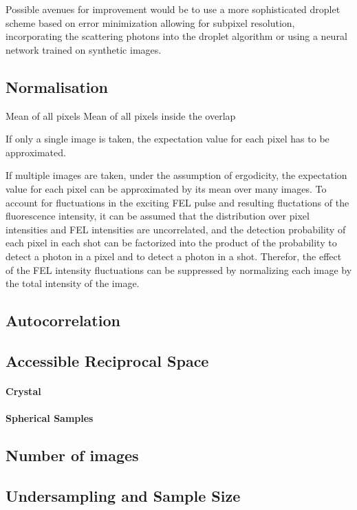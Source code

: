 Possible avenues for improvement would be to use a more sophisticated droplet scheme based on error minimization allowing for subpixel resolution, incorporating the scattering photons into the droplet algorithm or using a neural network trained on synthetic images.




\subsection{Normalisation}
Mean of all pixels 
Mean of all pixels inside the overlap

If only a single image is taken, the expectation value for each pixel has to be approximated.

If multiple images are taken, under the assumption of ergodicity, the expectation value for each pixel can be approximated by its mean over many images. To account for fluctuations in the exciting FEL pulse and resulting fluctations of the fluorescence intensity, it can be assumed that the distribution over pixel intensities and FEL intensities are uncorrelated, and the detection probability of each pixel in each shot can be factorized into the product of the probability to detect a photon in a pixel and to detect a photon in a shot. Therefor, the effect of the FEL intensity fluctuations can be suppressed by normalizing each image by the total intensity of the image.



\subsection{Autocorrelation}

\subsection{Accessible Reciprocal Space}
	\paragraph{Crystal}
	\paragraph{Spherical Samples}


\subsection{Number of images}
\subsection{Undersampling and  Sample Size}


